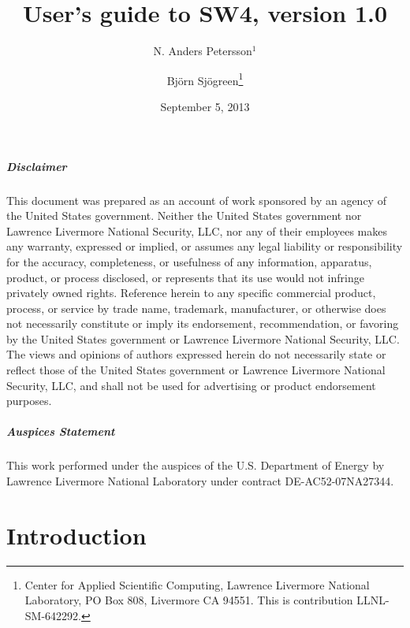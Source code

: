 \documentclass[11pt]{report}
\begin{document}
\title{\Huge\bf User's guide to SW4, version 1.0} 

\author{ N. Anders Petersson$^1$ \and Bj\"orn Sj\"ogreen\thanks{Center for Applied Scientific
     Computing, Lawrence Livermore National Laboratory, PO Box 808, Livermore CA 94551. This is
     contribution LLNL-SM-642292.}}
\date{September 5, 2013} 
\maketitle


\paragraph {Disclaimer} 
This document was prepared as an account of work sponsored by an agency of the United States
government. Neither the United States government nor Lawrence Livermore National Security, LLC, nor
any of their employees makes any warranty, expressed or implied, or assumes any legal liability or
responsibility for the accuracy, completeness, or usefulness of any information, apparatus, product,
or process disclosed, or represents that its use would not infringe privately owned
rights. Reference herein to any specific commercial product, process, or service by trade name,
trademark, manufacturer, or otherwise does not necessarily constitute or imply its endorsement,
recommendation, or favoring by the United States government or Lawrence Livermore National Security,
LLC. The views and opinions of authors expressed herein do not necessarily state or reflect those of
the United States government or Lawrence Livermore National Security, LLC, and shall not be used for
advertising or product endorsement purposes. 

\paragraph{Auspices Statement}
This work performed under the auspices of the U.S. Department of Energy by Lawrence Livermore
National Laboratory under contract DE-AC52-07NA27344.
\tableofcontents


\chapter{Introduction}
\end{document}
